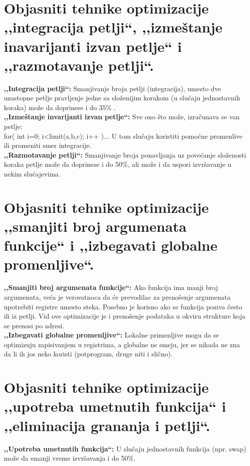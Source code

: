 \documentclass[a4paper]{article}
\begin{document}
\section{Objasniti tehnike optimizacije ,,integracija petlji``, ,,izmeštanje inavarijanti izvan petlje``
         i ,,razmotavanje petlji``.}
  
  \textbf{,,Integracija petlji``:} Smanjivanje broja petlji (integracija), umesto dve uzastopne 
  petlje pravljenje jedne sa složenijim korakom (u slučaju jednostavnih koraka) može da doprinese i 
  do 35\% . \\
  
  \textbf{,,Izmeštanje invarijanti izvan petlje``:} Sve ono što može, izračunava se van petlje:\\
  \indent for( int i=0; i<limit(a,b,c); i++ )... U tom slučaju koristiti pomoćne promenlive ili
  promeniti smer integracije. \\

  \textbf{,,Razmotavanje petlji``:} Smanjivanje broja ponavljanja uz povećanje složenosti koraka petlje može da doprinese i do 50\%, 
  ali može i da uspori izvršavanje u nekim slučajevima.
  
\section{Objasniti tehnike optimizacije ,,smanjiti broj argumenata funkcije`` i 
         ,,izbegavati globalne promenljive``.}
  \textbf{,,Smanjiti broj argumenata funkcije``:} Ako funkcija ima manji broj argumenata, 
  veća je verovatnoca da će prevodilac za prenošenje argumenata upotrebiti registre umesto steka. 
  Posebno je korisno ako se funkcija poziva često ili iz petlji. 
  Vid ove optimizacije je i prenošenje podataka u okviru strukture koja se prenosi po adresi.\\
  
  \textbf{,,Izbegavati globalne promenljive``:} Lokalne primenljive mogu da se optimizuju zapisivanjem 
  u registrima, a globalne ne smeju, jer se nikada ne zna da li ih jos neko koristi (potprogram, 
  druge niti i slično).
  
\section{Objasniti tehnike optimizacije ,,upotreba umetnutih funkcija`` i 
         ,,eliminacija grananja i petlji``.}
  
  \textbf{,,Upotreba umetnutih funkcija``:} U slučaju jednostavnih funkcija (npr. swap) može da smanji 
  vreme izvršavanja i do 50\%.\\
  
\end{document}
